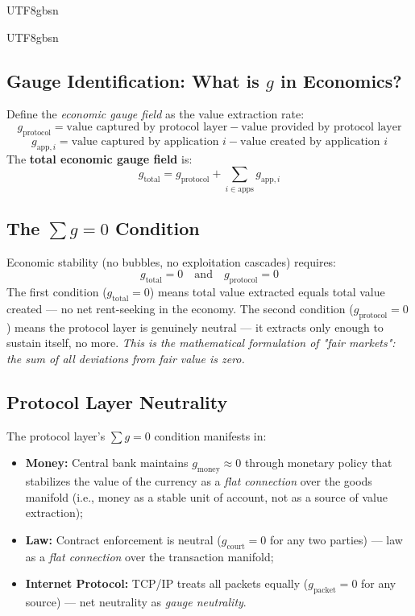 \documentclass[11pt,a4paper]{article}
\begin{document}
\begin{CJK}{UTF8}{gbsn}
{\begin{CJK}{UTF8}{gbsn}
\subsection{Gauge Identification: What is $g$ in Economics?}
Define the \textit{economic gauge field} as the value extraction rate:
\begin{equation}
    g_{\text{protocol}} = \text{value captured by protocol layer} - \text{value provided by protocol layer}
\end{equation}
\begin{equation}
    g_{\text{app}, i} = \text{value captured by application } i - \text{value created by application } i
\end{equation}
The \textbf{total economic gauge field} is:
\begin{equation}
    g_{\text{total}} = g_{\text{protocol}} + \sum_{i \in \text{apps}} g_{\text{app}, i}
\end{equation}
\subsection{The $\sum g = 0$ Condition}
Economic stability (no bubbles, no exploitation cascades) requires:
\begin{equation}
    \boxed{g_{\text{total}} = 0 \quad \text{and} \quad g_{\text{protocol}} = 0}
\end{equation}
The first condition ($g_{\text{total}} = 0$) means total value extracted equals total
value created --- no net rent-seeking in the economy. The second condition
($g_{\text{protocol}} = 0$) means the protocol layer is genuinely neutral --- it extracts
only enough to sustain itself, no more.
\textit{This is the mathematical formulation of "fair markets": the sum of all
deviations from fair value is zero.}
\subsection{Protocol Layer Neutrality}
The protocol layer's $\sum g = 0$ condition manifests in:
\begin{itemize}
    \item \textbf{Money:} Central bank maintains $g_{\text{money}} \approx 0$ through
          monetary policy that stabilizes the value of the currency as a
          \textit{flat connection} over the goods manifold (i.e., money as a
          stable unit of account, not as a source of value extraction);
    \item \textbf{Law:} Contract enforcement is neutral ($g_{\text{court}} = 0$ for
          any two parties) --- law as a \textit{flat connection} over the transaction manifold;
    \item \textbf{Internet Protocol:} TCP/IP treats all packets equally ($g_{\text{packet}} = 0$
          for any source) --- net neutrality as \textit{gauge neutrality}.
\end{itemize}

\end{CJK}}
\end{CJK}
\end{document}
